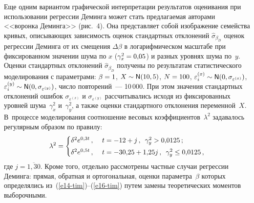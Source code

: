 \begin{multicols}{2}
  Еще одним вариантом графической интерпретации результатов
оценивания при использовании регрессии Деминга может стать предлагаемая
авторами <<воронка Деминга>> (рис.~4). Она представляет собой
изображение семейства кривых, опи\-сы\-ва\-ющих зависимость оценок
стандартных отклонений $\hat{\sigma}_{\beta_D}$ оценок регрессии Деминга
от их смещения $\Delta\beta$ в логарифмическом масштабе при
фиксированном значении шума по $x$ ($\gamma_x^2\hm=0{,}05$) и разных
уровнях шума по~$y$. Оценки стандартных отклонений
$\hat{\sigma}_{\beta_D}$ получены по результатам статистического
моделирования с параметрами: $\beta\hm=1$, $X\sim {\sf N}(10,5)$,
${N}\hm=100$, $\varepsilon_i^{(x)}\sim {\sf N}(0,
\sigma_{\varepsilon^{(x)}})$, $\varepsilon_i^{(y)} \sim
{\sf N}(0,\sigma_{\varepsilon^{(y)}})$, число повторений~--- 10\,000.
При этом значения стандартных отклонений ошибок
$\sigma_{\varepsilon^{(x)}}$ и $\sigma_{\varepsilon^{(y)}}$ рассчитывались
исходя из фиксированных уровней шума~$\gamma_x^2$ и~$\gamma_y^2$,
а также оценки стандартного отклонения переменной~$X$. В~процессе
моделирования соотношение весовых коэффициентов~$\lambda^2$
задавалось регулярным образом по правилу:
  $$
  \lambda^2=
  \begin{cases}
  \delta^2 e^{0{,}3t}\,, &\ t=-12+j\,, \enskip \gamma_y^2>0{,}0125\,;\\[3pt]
  \delta^2 e^{0{,}5t}\,, &\ t=-30{,}25+1{,}25j\,, \enskip \gamma^2_y\leq 0{,}0125\,,
  \end{cases}
  $$
где $j=\overline{1,30}$. Кроме того, отдельно рассмотрены частные случаи
регрессии Деминга: прямая, обратная и ортогональная, оценки
параметра~$\beta$ которых определялись из~(\ref{e14-tim})--(\ref{e16-tim})
путем замены теоретических моментов выборочными.

  \begin{figure*} %
   \vspace*{1pt}
 \begin{center}
 \mbox{%
 \epsfxsize=90.012mm
 }
 \end{center}
 \vspace*{-6pt}
\vspace*{3pt}
  \end{figure*}


\end{multicols}
